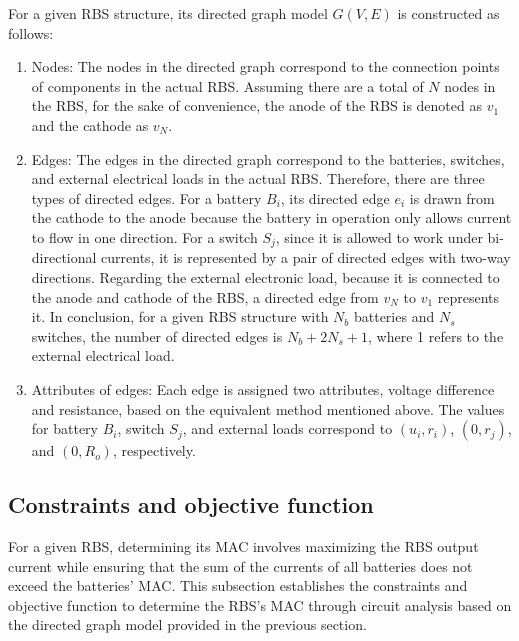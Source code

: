 \documentclass{article}
\begin{document}
For a given RBS structure, its directed graph model $G(V,E)$ is constructed as follows:
\begin{enumerate}
    \item Nodes:
        The nodes in the directed graph correspond to the connection points of components in the actual RBS. 
        Assuming there are a total of $N$ nodes in the RBS, for the sake of convenience, the anode of the RBS is denoted as $v_1$ and the cathode as $v_N$.
    \item Edges:
        The edges in the directed graph correspond to the batteries, switches, and external electrical loads in the actual RBS.
        Therefore, there are three types of directed edges. 
        For a battery $B_i$, its directed edge $e_i$ is drawn from the cathode to the anode because the battery in operation only allows current to flow in one direction.
        For a switch $S_j$, since it is allowed to work under bi-directional currents, it is represented by a pair of directed edges with two-way directions. 
        Regarding the external electronic load, because it is connected to the anode and cathode of the RBS, a directed edge from $v_N$ to $v_1$  represents it. 
        In conclusion, for a given RBS structure with $N_b$ batteries and $N_s$ switches, the number of directed edges is $N_b+2N_s+1$, where 1 refers to the external electrical load.
    \item Attributes of edges:
        Each edge is assigned two attributes, voltage difference and resistance, based on the equivalent method mentioned above.
        The values for  battery $B_i$, switch $S_j$, and external loads correspond to $(u_i, r_i)$, $(0, r_j)$, and $(0, R_o)$, respectively.
\end{enumerate}

\subsection{Constraints and objective function}

For a given RBS, determining its MAC involves maximizing the RBS output current while ensuring that the sum of the currents of all batteries does not exceed the batteries' MAC. 
This subsection establishes the constraints and objective function to determine the RBS's MAC  through circuit analysis based on the directed graph model provided in the previous section.
\end{document}
